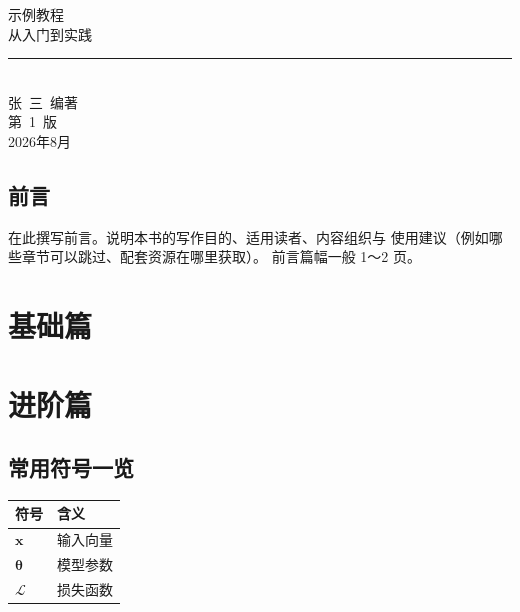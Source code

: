 \documentclass[
  UTF8,
  fontset=fandol,        %
  zihao=-4,              %
  a4paper,
  oneside,               %
]{ctexbook}
\newcommand{\vect}[1]{\boldsymbol{#1}}
\theoremstyle{definition}
\newcommand{\BookTitle}{示例教程}
\newcommand{\BookSubtitle}{从入门到实践}
\newcommand{\BookAuthor}{张~三~编著}
\newcommand{\BookEdition}{第~1~版}
\newcommand{\BookDate}{2026年8月}
\begin{document}
\begin{titlepage}
  \begin{center}
    \vspace*{4em}
    {\heiti \BookTitle}\\[1.2em]
    { \BookSubtitle}\\[2em]
    {\color{gray}\rule{0.4\textwidth}{0.6pt}}\\[10em]
    { \BookAuthor}\\[3em]
    { \BookEdition}\\[0.8em]
    { \BookDate}
  \end{center}
\end{titlepage}

\frontmatter  %
\chapter*{前言}
在此撰写前言。说明本书的写作目的、适用读者、内容组织与
使用建议（例如哪些章节可以跳过、配套资源在哪里获取）。
前言篇幅一般 1～2 页。

\tableofcontents

\mainmatter  %

\part{基础篇}


\part{进阶篇}


\appendix  %
\chapter{常用符号一览}
\begin{center}
  \begin{tabular}{ll}
    \toprule
    符号 & 含义 \\
    \midrule
    $\vect{x}$ & 输入向量 \\
    $\vect{\theta}$ & 模型参数 \\
    $\mathcal{L}$ & 损失函数 \\
    \bottomrule
  \end{tabular}
\end{center}
\end{document}
